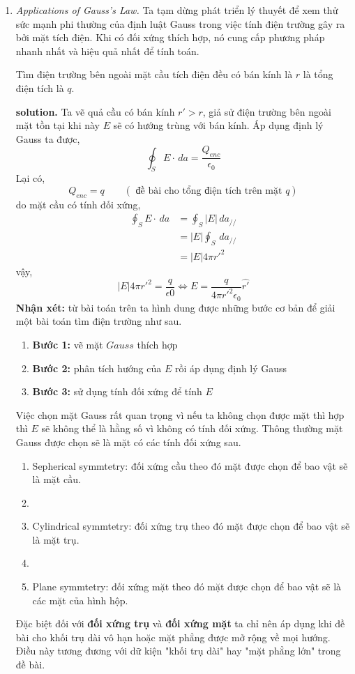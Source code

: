 \begin{enumerate}
\item \textit{Applications of Gauss's Law.}
Ta tạm dừng phát triển lý thuyết để xem thử sức mạnh phi thường của định luật Gauss trong việc tính điện trường gây ra bởi mặt tích điện. Khi có đối xứng thích hợp, nó cung cấp phương pháp nhanh nhất và hiệu quả nhất để tính toán.
\begin{problem}
Tìm điện trường bên ngoài mặt cầu tích điện đều có bán kính là $r$ là tổng điện tích là $q$.
\end{problem}
\textbf{solution.}
Ta vẽ quả cầu có bán kính $r' > r$, giả sử điện trường bên ngoài mặt tồn tại khi này $E$ sẽ có hướng trùng với bán kính. Áp dụng định lý Gauss ta được,
\[
\oint_{S} E \cdot \, da =  \frac{Q_{enc}}{\epsilon_{0}}
\]
Lại có,
\[
Q_{enc} = q \qquad (\text{ đề bài cho tổng điện tích trên mặt $q$})
\]
do mặt cầu có tính đối xứng,
\begin{align*}
\oint_{S} E \cdot \, da &=  \oint_{S} \left| E \right|  \, da_{//} \\[6pt]
&= \left| E \right| \oint_{S}  \, da_{//} \\[6pt]
&= \left| E \right| 4\pi r'^{2}
\end{align*}
vậy,
\[
\left| E \right| 4\pi r'^{2} = \frac{q}{\epsilon{0}} \Leftrightarrow E = \frac{q}{4 \pi r'^{2} \epsilon_{0}}\hat{r'}
\]
\textbf{Nhận xét:} từ bài toán trên ta hình dung được những bước cơ bản để giải một bài toán tìm điện trường như sau.
\begin{enumerate}[label={}]
    \item \textbf{Bước 1:} vẽ mặt $Gauss$ thích hợp
    \item \textbf{Bước 2:} phân tích hướng của $E$ rồi áp dụng định lý Gauss
    \item \textbf{Bước 3:} sử dụng tính đối xứng để tính $E$
\end{enumerate}
Việc chọn mặt Gauss rất quan trọng vì nếu ta không chọn được mặt thì hợp thì $E$ sẽ không thể là hằng số vì không có tính đối xứng. Thông thường mặt Gauss được chọn sẽ là mặt có các tính đối xứng sau.
\begin{enumerate}[label={}]
\item{Sepherical symmtetry:} đối xứng cầu theo đó mặt được chọn để bao vật sẽ là mặt cầu.
\item 
\item{Cylindrical symmtetry:} đối xứng trụ theo đó mặt được chọn để bao vật sẽ là mặt trụ.
\item 
\item{Plane symmtetry:} đối xứng mặt theo đó mặt được chọn để bao vật sẽ là các mặt của hình hộp.
\end{enumerate}
Đặc biệt đối với \textbf{đối xứng trụ} và \textbf{đối xứng mặt} ta chỉ nên áp dụng khi đề bài cho khối trụ dài vô hạn hoặc mặt phẳng được mở rộng về mọi hướng. Điều này tương đương với dữ kiện "khối trụ dài" hay "mặt phẳng lớn" trong đề bài.


\end{enumerate}
